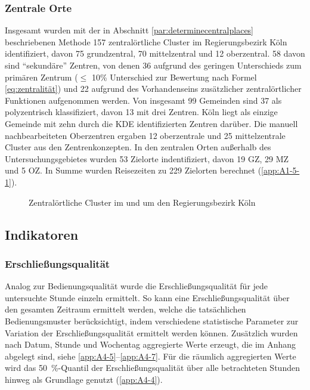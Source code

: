 \documentclass[11pt,pdftex,a4paper]{scrartcl}
\begin{document}
\subsubsection{Zentrale Orte}
Insgesamt wurden mit der in Abschnitt \ref{par:determinecentralplaces} beschriebenen Methode 157 zentralörtliche Cluster im Regierungsbezirk Köln identifiziert, davon 75 grundzentral, 70 mittelzentral und 12 oberzentral. 58 davon sind \enquote{sekundäre} Zentren, von denen 36 aufgrund des geringen Unterschieds zum primären Zentrum ($\leq$ 10\% Unterschied zur Bewertung nach Formel \ref{eq:zentralität}) und 22 aufgrund des Vorhandenseins zusätzlicher zentralörtlicher Funktionen aufgenommen werden. Von insgesamt 99 Gemeinden sind 37 als polyzentrisch klassifiziert, davon 13 mit drei Zentren. Köln liegt als einzige Gemeinde mit zehn durch die KDE identifizierten Zentren darüber. Die manuell nachbearbeiteten Oberzentren ergaben 12 oberzentrale und 25 mittelzentrale Cluster aus den Zentrenkonzepten. In den zentralen Orten außerhalb des Untersuchungsgebietes wurden 53 Zielorte indentifiziert, davon 19 GZ, 29 MZ und 5 OZ. In Summe wurden Reisezeiten zu 229 Zielorten berechnet (\ref{app:A1-5-1}).
\begin{figure}[!htbp]
	
	\caption{Zentralörtliche Cluster im und um den Regierungsbezirk Köln}
	\label{map:centralplaces}
\end{figure}

	\subsection{Indikatoren}
	 \subsubsection{Erschließungsqualität}
	 \label{sec:resultserschließung}
	 Analog zur Bedienungsqualität wurde die Erschließungsqualität für jede untersuchte Stunde einzeln ermittelt. So kann eine Erschließungsqualität über den gesamten Zeitraum ermittelt werden, welche die tatsächlichen Bedienungsmuster berücksichtigt, indem verschiedene statistische Parameter zur Variation der Erschließungsqualität ermittelt werden können. Zusätzlich wurden nach Datum, Stunde und Wochentag aggregierte Werte erzeugt, die im Anhang abgelegt sind, siehe \ref{app:A4-5}--\ref{app:A4-7}. Für die räumlich aggregierten Werte wird das \SI{50}{\percent}-Quantil der Erschließungsqualität über alle betrachteten Stunden hinweg als Grundlage genutzt (\ref{app:A4-4}). 
	
\end{document}
